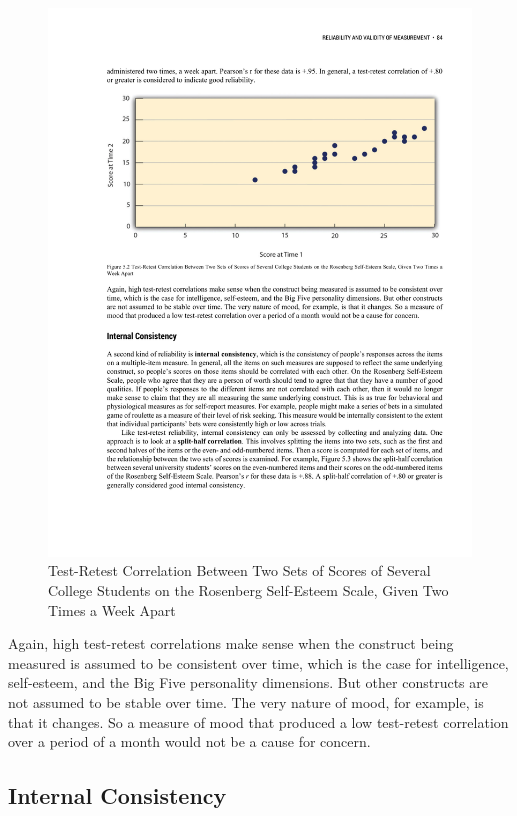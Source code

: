 \begin{figure}
      \includegraphics[width=\linewidth]{figures/C5testretest.pdf}
      \caption{Test-Retest Correlation Between Two Sets of Scores of Several College Students on the Rosenberg Self-Esteem Scale, Given Two Times a Week Apart}
      \label{fig:testretest}
\end{figure}

Again, high test-retest correlations make sense when the construct being measured is assumed to be consistent over time, which is the case for intelligence, self-esteem, and the Big Five personality dimensions. But other constructs are not assumed to be stable over time. The very nature of mood, for example, is that it changes. So a measure of mood that produced a low test-retest correlation over a period of a month would not be a cause for concern.


\subsection{Internal Consistency}

